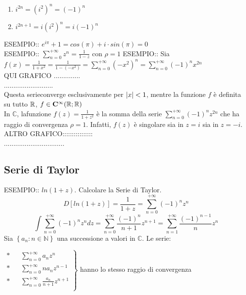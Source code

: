 \begin{enumerate}
	\item $i^{2n}=\left(i^2\right)^n=(-1)^n$
	\item $i^{2n+1}=i\left(i^2\right)^n=i(-1)^n$
\end{enumerate}
ESEMPIO:: $e^{i\pi}+1=cos(\pi)+i\cdot sin(\pi)=0$\\
ESEMPIO:: $\sum\limits_{n=0}^{+\infty}z^n=\frac{1}{1-z}$ con $\rho=1$
ESEMPIO:: Sia $f(x)=\frac{1}{1+x^2}=\frac{1}{1-(-x^2)} = \sum\limits_{n=0}^{+\infty}(-x^2)^n=\sum\limits_{n=0}^{+\infty}(-1)^nx^{2n}$\\
QUI GRAFICO ..............\\
..........................\\
Questa serieconverge esclusivamente per $\left|x\right|<1$, mentre la funzione $f$ è definita su tutto $ \mathbb{R}$, $f\in \mathbf{C^{\infty}}( \mathbb{R}; \mathbb{R})$\\
In $\mathbb{C}$, lafunzione $f(z)=\frac{1}{1+z^2}$ è la somma della serie $\sum\limits_{n=0}^{+\infty}(-1)^nz^{2n}$ che ha raggio di convergenza  $\rho=1$. Infatti, $f(z)$ è singolare sia in $z=i$ sia in $z=-i$.\\
ALTRO GRAFICO::::::::::::::::\\
................................\\

\subsection{Serie di Taylor}
ESEMPIO:: $ln(1+z)$. Calcolare la Serie di Taylor.\\
$$D\left[ln(1+z)\right] = \frac{1}{1+z} = \sum\limits_{n=0}^{+\infty}(-1)^nz^n$$
$$\int \sum\limits_{n=0}^{+\infty}(-1)^nz^n dz = \sum\limits_{n=0}^{+\infty}\frac{(-1)^n}{n+1}z^{n+1}=\sum\limits_{n=1}^{+\infty}\frac{(-1)^{n-1}}{n}z^n$$
\proposition
Sia $\left\{a_n:n\in\mathbb{N}\right\}$ una successione a valori in $\mathbb{C}$. Le serie:
\begin{center}
	$\left.\begin{matrix}
	
	\ast&&\sum\limits_{n=0}^{+\infty}a_nz^n\\
	\ast&&\sum\limits_{n=0}^{+\infty}na_nz^{n-1}\\
	\ast&&\sum\limits_{n=0}^{+\infty}\frac{a_n}{n+1}z^{n+1}\\
	
	\end{matrix}\right\}$ hanno lo stesso raggio di convergenza
\end{center}

